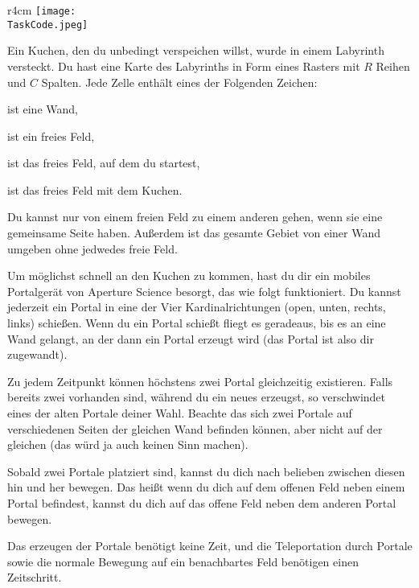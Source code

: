 \documentclass{boi2014-de}
\renewcommand{\TaskCode}{portals}
\newcommand{\constant}[1]{{\tt #1}}
\begin{document}
    \begin{wrapfigure}[4]{r}{4cm}
        \vspace{-24pt}
		\texttt{[image: \\TaskCode.jpeg]}
	\end{wrapfigure}
	
    Ein Kuchen, den du unbedingt verspeichen willst, wurde in einem Labyrinth versteckt. Du hast eine Karte des Labyrinths in Form eines Rasters mit $R$ Reihen und $C$ Spalten. Jede Zelle enthält eines der Folgenden Zeichen:
    \begin{description}[itemindent=1pt]
    	\item[\constant{\#}] ist eine Wand,
        \item[\constant{.}] ist ein freies Feld,
        \item[\constant{S}] ist das freies Feld, auf dem du startest,
        \item[\constant{C}] ist das freies Feld mit dem Kuchen.
    \end{description}
    
    Du kannst nur von einem freien Feld zu einem anderen gehen, wenn sie eine gemeinsame Seite haben. Außerdem ist das gesamte Gebiet von einer Wand umgeben ohne jedwedes freie Feld.
    
    Um möglichst schnell an den Kuchen zu kommen, hast du dir ein mobiles Portalgerät von Aperture Science\texttrademark{} besorgt, das wie folgt funktioniert.
    Du kannst jederzeit ein Portal in eine der Vier Kardinalrichtungen (open, unten, rechts, links) schießen. Wenn du ein Portal schießt fliegt es geradeaus, bis es an eine Wand gelangt, an der dann ein Portal erzeugt wird (das Portal ist also dir zugewandt).
    
    Zu jedem Zeitpunkt können höchstens zwei Portal gleichzeitig existieren. Falls bereits zwei vorhanden sind, während du ein neues erzeugst, so verschwindet eines der alten Portale deiner Wahl. Beachte das sich zwei Portale auf verschiedenen Seiten der gleichen Wand befinden können, aber nicht auf der gleichen (das würd ja auch keinen Sinn machen).
    
    Sobald zwei Portale platziert sind, kannst du dich nach belieben zwischen diesen hin und her bewegen. Das heißt wenn du dich auf dem offenen Feld neben einem Portal befindest, kannst du dich auf das offene Feld neben dem anderen Portal bewegen. %
    
    Das erzeugen der Portale benötigt keine Zeit, und die Teleportation durch Portale sowie die normale Bewegung auf ein benachbartes Feld benötigen einen Zeitschritt.
\end{document}
